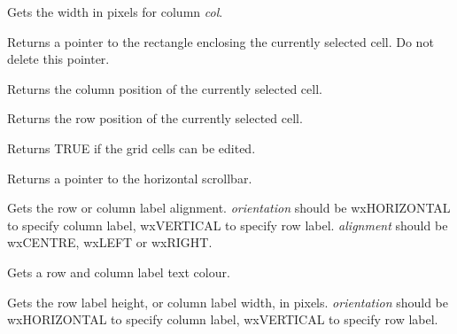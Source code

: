 Gets the width in pixels for column {\it col}.

\label{wxgridgetcurrentrect}


Returns a pointer to the rectangle enclosing the currently selected cell.
Do not delete this pointer.

\label{wxgridgetcursorcolumn}


Returns the column position of the currently selected cell.

\label{wxgridgetcursorrow}


Returns the row position of the currently selected cell.

\label{wxgridgeteditable}


Returns TRUE if the grid cells can be edited.

\label{wxgridgethorizscrollbar}


Returns a pointer to the horizontal scrollbar.

\label{wxgridgetlabelalignment}


Gets the row or column label alignment. {\it orientation} should
be wxHORIZONTAL to specify column label, wxVERTICAL to specify row label.\rtfsp
{\it alignment} should be wxCENTRE, wxLEFT or wxRIGHT.

\label{wxgridgetlabelbackgroundcolour}


Gets a row and column label text colour.

\label{wxgridgetlabelsize}


Gets the row label height, or column label width, in pixels. {\it orientation} should
be wxHORIZONTAL to specify column label, wxVERTICAL to specify row label.

